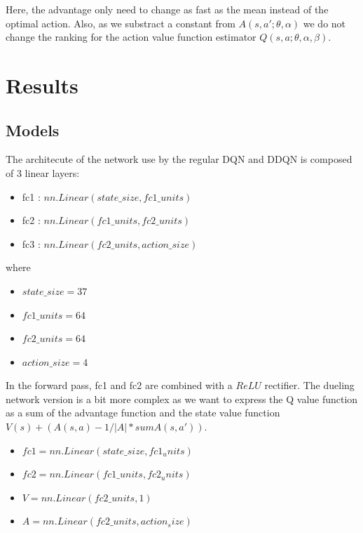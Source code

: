 \documentclass[12pt]{article}
\begin{document}
Here, the advantage only need to change as fast as the mean instead of the optimal action. Also, as we substract a constant from $A(s,a';\theta,\alpha)$ we do not change the ranking for the action value function estimator $Q(s,a;\theta,\alpha,\beta)$.


\section*{Results} 
\subsection{Models}
The architecute of the network use by the regular DQN and DDQN is composed of 3 linear layers:

\begin{itemize}
\item fc1 : $nn.Linear(state\_size, fc1\_units)$
\item fc2 : $nn.Linear(fc1\_units, fc2\_units)$
\item fc3 : $nn.Linear(fc2\_units, action\_size)$
\end{itemize}
 
where 

\begin{itemize}
\item $state\_size=37$
\item $fc1\_units=64$
\item $fc2\_units=64$
\item $action\_size=4$
\end{itemize}

In the forward pass, fc1 and fc2 are combined with a $ReLU$ rectifier.
The dueling network version is a bit more complex as we want to express the Q value function as a sum of the advantage function and the state value function $V(s) + (A(s,a) - 1/|A| * sum A(s,a'))$.

\begin{itemize}
\item $fc1 = nn.Linear(state\_size, fc1_units)$
\item $fc2 = nn.Linear(fc1\_units, fc2_units)$
\item $V = nn.Linear(fc2\_units, 1)$
\item $A = nn.Linear(fc2\_units, action_size)$
\end{itemize}
\end{document}
